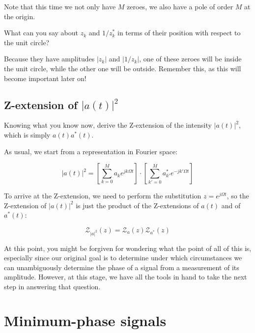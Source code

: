 Note that this time we not only have $M$ zeroes, we also have a pole of order $M$ at the origin.

\begin{cue}
What can you say about $z_k$ and $1/z_k^*$ in terms of their position with respect to the unit circle?
\end{cue}

Because they have amplitudes $|z_k|$ and $|1/z_k|$, one of these zeroes will be inside the unit circle, while the other one will be outside. Remember this, as this will become important later on!

\pagebreak

\subsection{Z-extension of $|a(t)|^2$}

\begin{cue}
Knowing what you know now, derive the Z-extension of the intensity $|a(t)|^2$, which is simply $a(t)a^*(t)$.
\end{cue}

As usual, we start from a representation in Fourier space:

\begin{equation}
|a(t)|^2 = \left[  \sum_{k=0}^M a_k e^{jk\Omega t} \right] \cdot \left[ \sum_{k'=0}^M a_{k'}^* e^{-jk'\Omega t}\right]     
\end{equation}

To arrive at the Z-extension, we need to perform the substitution $z=e^{j\Omega t}$, so the Z-extension of $|a(t)|^2$ is just the product of the Z-extensions of $a(t)$ and of $a^*(t)$:

\begin{equation}
\mathcal{Z}_{|a|^2}(z) = \mathcal{Z}_a(z) \mathcal{Z}_{a^*}(z)
\end{equation}

At this point, you might be forgiven for wondering what the point of all of this is, especially since our original goal is to determine under which circumstances we can unambiguously determine the phase of a signal from a measurement of its amplitude. However, at this stage, we have all the tools in hand to take the next step in answering that question.

\pagebreak

\section{Minimum-phase signals}

